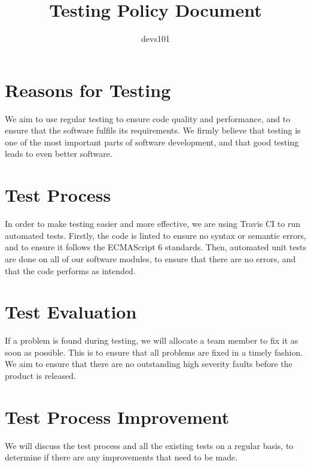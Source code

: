 \documentclass{article}
\title{Testing Policy Document}
\author{devs101}
\begin{document}
\maketitle
\newpage

\section{Reasons for Testing}
We aim to use regular testing to ensure code quality and performance, and to ensure that the software fulfils its requirements.
We firmly believe that testing is one of the most important parts of software development, and that good testing leads to even
better software.

\section{Test Process}
In order to make testing easier and more effective, we are using Travis CI to run automated tests. Firstly, the code is linted
to ensure no syntax or semantic errors, and to ensure it follows the ECMAScript 6 standards. Then, automated unit tests are done
on all of our software modules, to ensure that there are no errors, and that the code performs as intended.

\section{Test Evaluation}
If a problem is found during testing, we will allocate a team member to fix it as soon as possible. This is to ensure that all
problems are fixed in a timely fashion. We aim to ensure that there are no outstanding high severity faults before the product is released.

\section{Test Process Improvement}
We will discuss the test process and all the existing tests on a regular basis, to determine if there are any improvements that need to be made.
\end{document}
